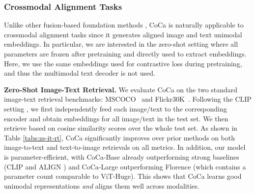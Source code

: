 \begin{table}[t]
\centering
\small
{}
\caption{\label{tabs:msrvtt} Zero-shot Video-Text Retrieval on MSR-VTT Full test set.}
\end{table} 
\subsubsection{Crossmodal Alignment Tasks}
\label{secs:cross_modal_alignment}

Unlike other fusion-based foundation methods \cite{wang2021simvlm,singh2021flava,wang2022unifying},
CoCa is naturally applicable to crossmodal alignment tasks since it generates aligned image and text unimodal embeddings.
In particular, we are interested in the zero-shot setting where all parameters are frozen after pretraining and directly used to extract embeddings.
Here, we use the same embeddings used for contrastive loss during pretraining, and thus the multimodal text decoder is not used.


\textbf{Zero-Shot Image-Text Retrieval.}
We evaluate CoCa on the two standard image-text retrieval benchmarks: MSCOCO~\cite{chen2015microsoft} and Flickr30K~\cite{plummer2015flickr30k}. 
Following the CLIP setting \cite{radford2021learning},
we first independently feed each image/text to the corresponding encoder and obtain embeddings for all image/text in the test set.
We then retrieve based on cosine similarity scores over the whole test set.
As shown in Table \ref{tabs:zs-it-rt},
CoCa significantly improves over prior methods on both image-to-text and text-to-image retrievals on all metrics.
In addition,
our model is parameter-efficient,
with CoCa-Base already outperforming strong baselines (CLIP \cite{radford2021learning} and ALIGN \cite{jia2021scaling}) and CoCa-Large outperforming Florence \cite{yuan2021florence} (which contains a parameter count comparable to ViT-Huge). 
This shows that CoCa learns good unimodal representations \emph{and} aligns them well across modalities.

